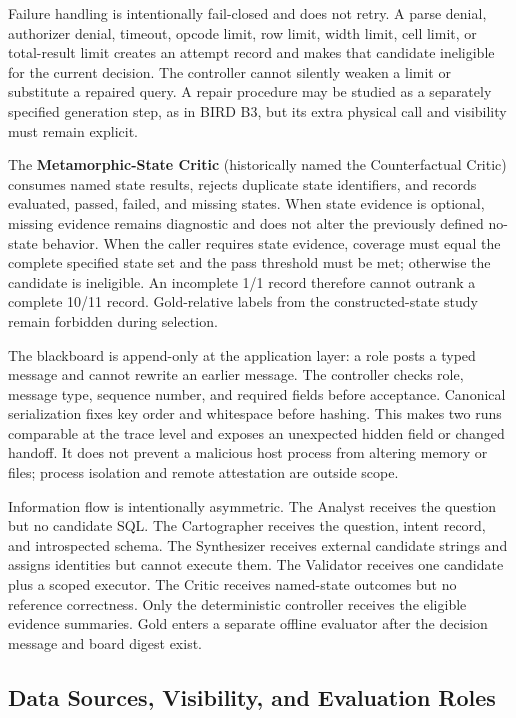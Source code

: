 \documentclass[information,article,submit,moreauthors]{Definitions/mdpi}
\begin{document}
Failure handling is intentionally fail-closed and does not retry. A parse denial, authorizer denial, timeout, opcode limit, row limit, width limit, cell limit, or total-result limit creates an attempt record and makes that candidate ineligible for the current decision. The controller cannot silently weaken a limit or substitute a repaired query. A repair procedure may be studied as a separately specified generation step, as in BIRD B3, but its extra physical call and visibility must remain explicit.

The \textbf{Metamorphic-State Critic} (historically named the Counterfactual Critic) consumes named state results, rejects duplicate state identifiers, and records evaluated, passed, failed, and missing states. When state evidence is optional, missing evidence remains diagnostic and does not alter the previously defined no-state behavior. When the caller requires state evidence, coverage must equal the complete specified state set and the pass threshold must be met; otherwise the candidate is ineligible. An incomplete 1/1 record therefore cannot outrank a complete 10/11 record. Gold-relative labels from the constructed-state study remain forbidden during selection.

The blackboard is append-only at the application layer: a role posts a typed message and cannot rewrite an earlier message. The controller checks role, message type, sequence number, and required fields before acceptance. Canonical serialization fixes key order and whitespace before hashing. This makes two runs comparable at the trace level and exposes an unexpected hidden field or changed handoff. It does not prevent a malicious host process from altering memory or files; process isolation and remote attestation are outside scope.

Information flow is intentionally asymmetric. The Analyst receives the question but no candidate SQL. The Cartographer receives the question, intent record, and introspected schema. The Synthesizer receives external candidate strings and assigns identities but cannot execute them. The Validator receives one candidate plus a scoped executor. The Critic receives named-state outcomes but no reference correctness. Only the deterministic controller receives the eligible evidence summaries. Gold enters a separate offline evaluator after the decision message and board digest exist.

\subsection{Data Sources, Visibility, and Evaluation Roles}
\end{document}
